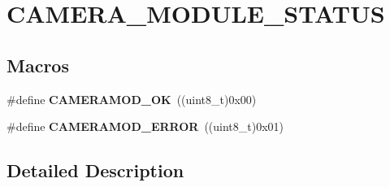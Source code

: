 \hypertarget{group___c_a_m_e_r_a___m_o_d_u_l_e___s_t_a_t_u_s}{}\section{C\+A\+M\+E\+R\+A\+\_\+\+M\+O\+D\+U\+L\+E\+\_\+\+S\+T\+A\+T\+US}
\label{group___c_a_m_e_r_a___m_o_d_u_l_e___s_t_a_t_u_s}
\subsection*{Macros}
\begin{DoxyCompactItemize}
\item 
\mbox{\label{group___c_a_m_e_r_a___m_o_d_u_l_e___s_t_a_t_u_s_ga63e1f3ebacf3f865fc877aca4c69dd7e}} 
\#define {\bfseries C\+A\+M\+E\+R\+A\+M\+O\+D\+\_\+\+OK}~((uint8\+\_\+t)0x00)
\item 
\mbox{\label{group___c_a_m_e_r_a___m_o_d_u_l_e___s_t_a_t_u_s_ga3d3b60827aad3cb9ca47ef2623519a2a}} 
\#define {\bfseries C\+A\+M\+E\+R\+A\+M\+O\+D\+\_\+\+E\+R\+R\+OR}~((uint8\+\_\+t)0x01)
\end{DoxyCompactItemize}


\subsection{Detailed Description}
